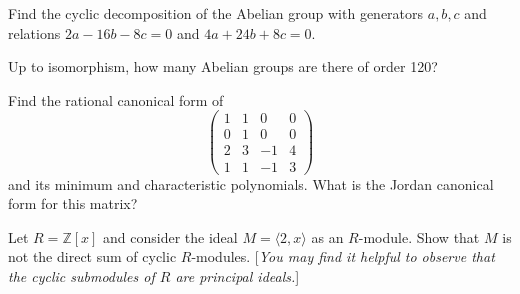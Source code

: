 \documentclass[answers]{exam}
\begin{document}
\begin{questions}



\question%
Find the cyclic decomposition of the Abelian group with generators $a, b, c$ and relations $2 a-16 b-8 c=0$ and $4 a+24 b+8 c=0$.



\question%
Up to isomorphism, how many Abelian groups are there of order 120?



\question%
Find the rational canonical form of \[
	\begin{pmatrix}
		1 & 1 & 0 & 0 \\
		0 & 1 & 0 & 0 \\
		2 & 3 & -1 & 4 \\
		1 & 1 & -1 & 3
	\end{pmatrix}
\] and its minimum and characteristic polynomials. What is the Jordan canonical form for this matrix?



\question%
Let $R=\mathbb{Z}[x]$ and consider the ideal $M=\langle 2, x\rangle$ as an $R$-module. Show that $M$ is not the direct sum of cyclic $R$-modules. [\emph{You may find it helpful to observe that the cyclic submodules of $R$ are principal ideals.}]

\end{questions}
\end{document}
